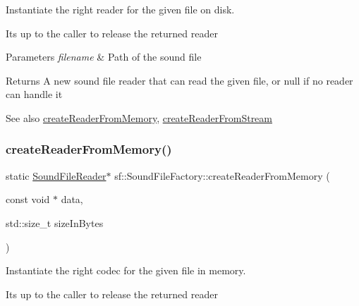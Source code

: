 Instantiate the right reader for the given file on disk. 

It\textquotesingle{}s up to the caller to release the returned reader


\begin{DoxyParams}{Parameters}
{\em filename} & Path of the sound file\\
\hline
\end{DoxyParams}
\begin{DoxyReturn}{Returns}
A new sound file reader that can read the given file, or null if no reader can handle it
\end{DoxyReturn}
\begin{DoxySeeAlso}{See also}
\hyperlink{classsf_1_1_sound_file_factory_aee7a0ff1eace98d5325eaadc7d26d50c}{create\+Reader\+From\+Memory}, \hyperlink{classsf_1_1_sound_file_factory_a8d4b1f225b72a128ddba3be22f7ba5a2}{create\+Reader\+From\+Stream} 
\end{DoxySeeAlso}
\mbox{\label{classsf_1_1_sound_file_factory_aee7a0ff1eace98d5325eaadc7d26d50c}} 
\subsubsection{\texorpdfstring{create\+Reader\+From\+Memory()}{createReaderFromMemory()}}
{\footnotesize\ttfamily static \hyperlink{classsf_1_1_sound_file_reader}{Sound\+File\+Reader}$\ast$ sf\+::\+Sound\+File\+Factory\+::create\+Reader\+From\+Memory (\begin{DoxyParamCaption}\item[{const void $\ast$}]{data,  }\item[{std\+::size\+\_\+t}]{size\+In\+Bytes }\end{DoxyParamCaption})\hspace{0.3cm}{\ttfamily [static]}}



Instantiate the right codec for the given file in memory. 

It\textquotesingle{}s up to the caller to release the returned reader


